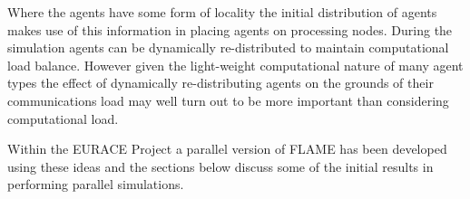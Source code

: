 Where the agents have some form of locality the initial distribution of agents makes use of this information in placing agents on processing nodes. During the simulation agents can be dynamically re-distributed to maintain computational load balance. However given the light-weight computational nature of many agent types the effect of dynamically re-distributing agents on the grounds of their communications load may well turn out to be more important than considering computational load.

Within the EURACE Project a parallel version of FLAME has been developed using these ideas and the sections below discuss some of the initial results in performing parallel simulations.


